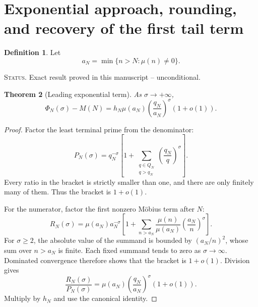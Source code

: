 \documentclass[11pt]{amsart}
\numberwithin{equation}{section}
\theoremstyle{plain}
\newtheorem{theorem}{Theorem}[section]
\theoremstyle{definition}
\newtheorem{definition}[theorem]{Definition}
\theoremstyle{remark}
\newcommand{\1}{\mathbf{1}}
\newcommand{\statusnote}[1]{%
  \par\smallskip\noindent
  \begingroup\footnotesize\textsc{Status.} #1\endgroup
  \par\smallskip}
\begin{document}
\section{Exponential approach, rounding, and recovery of the first tail term}
\label{sec:asymptotic_recovery}

\begin{definition}
\label{def:aN}
Let
\begin{equation}
a_N
=
\min\{n>N:\mu(n)\neq0\}.
\label{eq:aN_definition}
\end{equation}
\end{definition}

\statusnote{Exact result proved in this manuscript -- unconditional.}
\begin{theorem}[Leading exponential term]
\label{thm:leading_exponential}
As \(\sigma\to+\infty\),
\begin{equation}
\boxed{
\Phi_N(\sigma)-M(N)
=
h_N\mu(a_N)
\left(\frac{q_N}{a_N}\right)^\sigma
\left(1+o(1)\right).
}
\label{eq:leading_exponential}
\end{equation}
\end{theorem}

\begin{proof}
Factor the least terminal prime from the denominator:
\begin{equation}
P_N(\sigma)
=
q_N^{-\sigma}
\left[
1+
\sum_{\substack{q\in Q_N\\q>q_N}}
\left(\frac{q_N}{q}\right)^\sigma
\right].
\label{eq:leading_P_factorization}
\end{equation}
Every ratio in the bracket is strictly smaller than one, and there are only
finitely many of them.  Thus the bracket is \(1+o(1)\).

For the numerator, factor the first nonzero Möbius term after \(N\):
\begin{equation}
R_N(\sigma)
=
\mu(a_N)a_N^{-\sigma}
\left[
1+
\sum_{n>a_N}
\frac{\mu(n)}{\mu(a_N)}
\left(\frac{a_N}{n}\right)^\sigma
\right].
\label{eq:leading_R_factorization}
\end{equation}
For \(\sigma\geq2\), the absolute value of the summand is bounded by
\((a_N/n)^2\), whose sum over \(n>a_N\) is finite.  Each fixed summand
tends to zero as \(\sigma\to\infty\).  Dominated convergence therefore
shows that the bracket is \(1+o(1)\).  Division gives
\begin{equation}
\frac{R_N(\sigma)}{P_N(\sigma)}
=
\mu(a_N)
\left(\frac{q_N}{a_N}\right)^\sigma
(1+o(1)).
\label{eq:leading_ratio_detailed}
\end{equation}
Multiply by \(h_N\) and use the canonical identity.
\end{proof}
\end{document}
